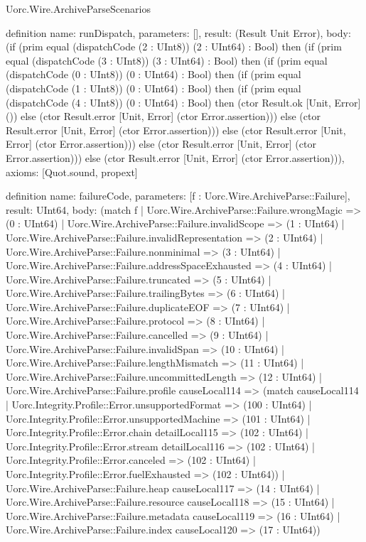 \begin{lexlean}{Uorc.Wire.ArchiveParseScenarios}
\begin{semanticmodule}
definition{
  name: runDispatch,
  parameters: [],
  result: (Result Unit Error),
  body: (if (prim equal (dispatchCode (2 : UInt8)) (2 : UInt64) : Bool) then (if (prim equal (dispatchCode (3 : UInt8)) (3 : UInt64) : Bool) then (if (prim equal (dispatchCode (0 : UInt8)) (0 : UInt64) : Bool) then (if (prim equal (dispatchCode (1 : UInt8)) (0 : UInt64) : Bool) then (if (prim equal (dispatchCode (4 : UInt8)) (0 : UInt64) : Bool) then (ctor Result.ok [Unit, Error] ()) else (ctor Result.error [Unit, Error] (ctor Error.assertion))) else (ctor Result.error [Unit, Error] (ctor Error.assertion))) else (ctor Result.error [Unit, Error] (ctor Error.assertion))) else (ctor Result.error [Unit, Error] (ctor Error.assertion))) else (ctor Result.error [Unit, Error] (ctor Error.assertion))),
  axioms: [Quot.sound, propext]
}

definition{
  name: failureCode,
  parameters: [f : Uorc.Wire.ArchiveParse::Failure],
  result: UInt64,
  body: (match f
    | Uorc.Wire.ArchiveParse::Failure.wrongMagic => (0 : UInt64)
    | Uorc.Wire.ArchiveParse::Failure.invalidScope => (1 : UInt64)
    | Uorc.Wire.ArchiveParse::Failure.invalidRepresentation => (2 : UInt64)
    | Uorc.Wire.ArchiveParse::Failure.nonminimal => (3 : UInt64)
    | Uorc.Wire.ArchiveParse::Failure.addressSpaceExhausted => (4 : UInt64)
    | Uorc.Wire.ArchiveParse::Failure.truncated => (5 : UInt64)
    | Uorc.Wire.ArchiveParse::Failure.trailingBytes => (6 : UInt64)
    | Uorc.Wire.ArchiveParse::Failure.duplicateEOF => (7 : UInt64)
    | Uorc.Wire.ArchiveParse::Failure.protocol => (8 : UInt64)
    | Uorc.Wire.ArchiveParse::Failure.cancelled => (9 : UInt64)
    | Uorc.Wire.ArchiveParse::Failure.invalidSpan => (10 : UInt64)
    | Uorc.Wire.ArchiveParse::Failure.lengthMismatch => (11 : UInt64)
    | Uorc.Wire.ArchiveParse::Failure.uncommittedLength => (12 : UInt64)
    | Uorc.Wire.ArchiveParse::Failure.profile causeLocal114 => (match causeLocal114
      | Uorc.Integrity.Profile::Error.unsupportedFormat => (100 : UInt64)
      | Uorc.Integrity.Profile::Error.unsupportedMachine => (101 : UInt64)
      | Uorc.Integrity.Profile::Error.chain detailLocal115 => (102 : UInt64)
      | Uorc.Integrity.Profile::Error.stream detailLocal116 => (102 : UInt64)
      | Uorc.Integrity.Profile::Error.canceled => (102 : UInt64)
      | Uorc.Integrity.Profile::Error.fuelExhausted => (102 : UInt64))
    | Uorc.Wire.ArchiveParse::Failure.heap causeLocal117 => (14 : UInt64)
    | Uorc.Wire.ArchiveParse::Failure.resource causeLocal118 => (15 : UInt64)
    | Uorc.Wire.ArchiveParse::Failure.metadata causeLocal119 => (16 : UInt64)
    | Uorc.Wire.ArchiveParse::Failure.index causeLocal120 => (17 : UInt64))
}


\end{semanticmodule}
\end{lexlean}

